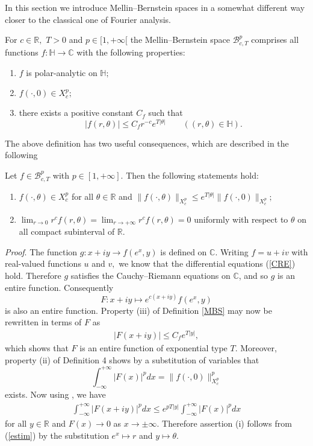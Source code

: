 \documentclass[amsmath,english,a4paper,graphicx,12pt]{article}
\begin{document}
In this section we introduce Mellin--Bernstein spaces in a somewhat different way closer to the classical one of Fourier analysis.
\begin{Definition}\label{MBS}
For $c \in \mathbb{R},$ $T>0$ and $p \in [1, +\infty[$ the {\rm Mellin--Bernstein space} $\mathscr{B}^p_{c,T}$ comprises all functions $f: \mathbb{H}\rightarrow \mathbb{C}$ with the following properties:
\begin{enumerate}
\item[(i)] $f$ is polar-analytic on $\mathbb{H};$
\item[(ii)] $f(\cdot, 0) \in X^p_{c};$
\item[(iii)] there exists a positive constant $C_f$ such that
$$|f(r,\theta)| \leq C_fr^{-c}e^{T|\theta|}\qquad ((r, \theta) \in \mathbb{H}).$$
\end{enumerate}
\end{Definition}
The above definition has two useful consequences, which are described in the following
\begin{Theorem}\label{asympt}
Let $f \in \mathscr{B}^p_{c,T}$ with $p \in [1, +\infty].$ Then the following statements hold:
\begin{enumerate}
\item[(i)] $f(\cdot, \theta) \in X^p_c$ for all $\theta \in \mathbb{R}$ and $\|f(\cdot, \theta)\|_{X^p_c} \leq e^{T|\theta|}\|f(\cdot, 0)\|_{X^p_c};$
\item[(ii)] $\lim_{r \rightarrow 0}r^cf(r,\theta) = \lim_{r \rightarrow +\infty}r^cf(r,\theta) = 0$ uniformly with respect to $\theta$ on all compact subinterval of $\mathbb{R}.$
\end{enumerate}
\end{Theorem}
{\it Proof}. The function $g: x+iy \rightarrow f(e^x,y)$ is defined on $\mathbb{C}.$ Writing $f = u + iv$ with real-valued functions $u$ and $v,$ 
we know that the differential equations (\ref{CRE}) hold. Therefore $g$ satisfies the Cauchy--Riemann equations on $\mathbb{C}$, and so $g$ is 
an entire function. Consequently
$$F: x+iy \longmapsto e^{c(x+iy)}f(e^x,y)$$
is also an entire function. Property (iii) of Definition \ref{MBS} may now be rewritten in terms of $F$ as
\begin{eqnarray}\label{expo2}
|F(x+iy)| \leq C_fe^{T|y|},
\end{eqnarray}
which shows that $F$ is an entire function of exponential type $T.$ Moreover, property (ii) of Definition 4 shows by a substitution of variables that
$$\int_{-\infty}^{+\infty} |F(x)|^pdx = \|f(\cdot, 0)\|_{X^p_c}^p$$
exists. Now using \cite[Theorem~6.7.1]{BO}, we have
\begin{eqnarray}\label{estim}
\int_{-\infty}^{+\infty} |F(x+iy)|^pdx \leq e^{pT|y|}\int_{-\infty}^{+\infty} |F(x)|^pdx
\end{eqnarray}
for all $y \in \mathbb{R}$ and $F(x) \rightarrow 0$ as $x \rightarrow \pm \infty.$ Therefore assertion (i) follows from (\ref{estim}) by the 
substitution $e^x \mapsto r$ and $y\mapsto \theta.$
\end{document}
